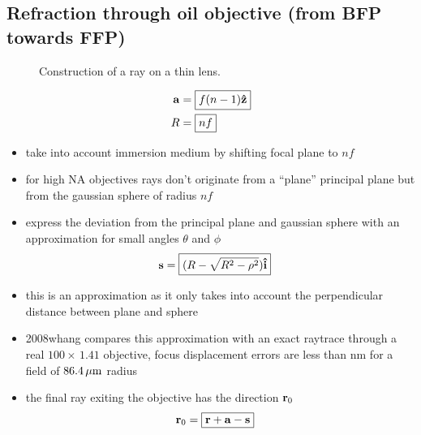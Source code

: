 \documentclass[twocolumn,DIV19]{scrartcl}
\begin{document}
\subsection{Refraction through oil objective (from BFP towards FFP)}
\begin{figure}[!hbt]
  \centering
  
  \caption{Construction of a ray on a thin lens.}
\end{figure}
\begin{align}
  \mathbf{a} &= \boxed{f (n-1) \mathbf{\hat{z}}} \\
  R &= \boxed{nf}
\end{align}
\begin{itemize}
\item take into account immersion medium by shifting focal plane to
  $nf$
\item for high NA objectives rays don't originate from a ``plane''
  principal plane but from the gaussian sphere of radius $nf$
\item express the deviation from the principal plane and gaussian
  sphere with an approximation for small angles $\theta$ and $\phi$
\begin{align}
  \mathbf{s} &= \boxed{(R - \sqrt{R^2-\rho^2})\mathbf{\hat{i}}}
\end{align}
\item this is an approximation as it only takes into account the
  perpendicular distance between plane and sphere
\item 2008whang compares this approximation with an exact raytrace
  through a real $100\times\,1.41$ objective, focus displacement
  errors are less than \unit[130]{nm} for a field of $\unit[86.4]{\mu
    m}$ radius
\item the final ray exiting the objective has the direction $\mathbf{r}_0$
\begin{align}
  \mathbf{r}_0 &= \boxed{\mathbf{r} + \mathbf{a} - \mathbf{s}}
\end{align}
\end{itemize}
\end{document}
